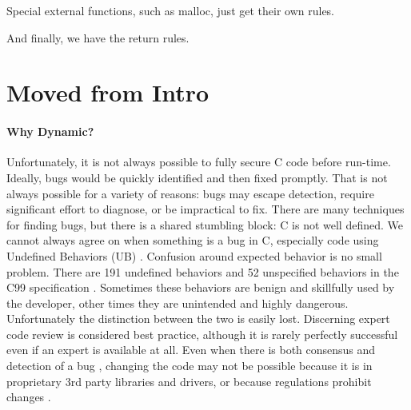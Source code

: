 \documentclass{llncs}
\begin{document}
\extcallstep

Special external functions, such as malloc, just get their own rules.

\mallocstep

And finally, we have the return rules.

\returnstep
\retvalstep
\retnovalstep

\section{Moved from Intro}

\paragraph*{Why Dynamic?}
  
  Unfortunately, it is not always possible to fully secure C code before run-time.
  Ideally, bugs would be quickly identified and then fixed promptly. 
  That is not always possible for a variety of reasons: bugs may escape detection, 
  require significant effort to diagnose, or be impractical to fix. 
  There are many techniques for finding bugs, but there is a shared stumbling block: C is not 
  well defined. We cannot always agree on when something is a bug in C, especially code using
   Undefined Behaviors (UB) \cite{defactoC}. Confusion around expected behavior is no small problem. 
  There are 191 undefined behaviors and 52 unspecified behaviors in the C99 
  specification \cite{Csmith}. Sometimes these behaviors are benign and skillfully 
  used by the developer, other times they are unintended and highly dangerous. 
  Unfortunately the distinction between the two is easily lost. 
  Discerning expert code review is considered best practice, although it is 
  rarely perfectly successful \cite{} %
  even if an expert is available at all. Even when there is both consensus 
  and detection of a bug , 
  changing the code may not be possible because  
  it is in proprietary 3rd party libraries and drivers, or because
  regulations prohibit changes \cite{Bessey10:Coverity}.

   
\end{document}
